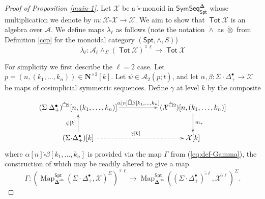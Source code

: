 \documentclass[11pt]{amsart}
\theoremstyle{definition}
\theoremstyle{remark}
\newcommand{\Spt}{\mathsf{Spt}}
\newcommand{\Tot}{\operatorname{\mathsf{Tot}}}
\newcommand{\SymSeq}{\mathsf{SymSeq}}
\newcommand{\Map}{\operatorname{Map}}
\newcommand{\homu}{\operatorname{\mathbf{hom}}}
\newcommand{\Cal}[1]{\mathcal{#1}}
\newcommand{\Ncirc}[1]{\mathbf{N}^{\hat{\circ}#1}}
\newcommand{\circhat}{\hat{\circ}}
\newcommand{\tensordot}{\dot{\otimes}}
\newcommand{\boxcirc}{\mathring{\square}}
\newcommand{\SD}{\Sigma{\cdot}\Delta^{\bullet}}
\newcommand{\bdel}{\mathbf{\Delta}}
\newcommand{\Dres}{\bdel^{\mathsf{res}}}
\begin{document}
\begin{proof}[Proof of Proposition \ref{main-1}]

Let $\Cal{X}$ be a $\boxcirc$-monoid in $\SymSeq^{\bdel}_{\Spt}$ whose multiplication we denote by $m\colon \Cal{X}\boxcirc \Cal{X}\to\Cal{X}$. We aim to show that $\Tot \Cal{X}$ is an algebra over $\Cal{A}$. We define maps $\lambda_{\ell}$ as follows (note the notation $\dot{\wedge}$ as $\tensordot$ from Definition \ref{ccp} for the monoidal category $(\Spt,\wedge,S)$)\[
    \lambda_{\ell}\colon \Cal{A}_{\ell}\dot{\wedge}_{\Sigma} (\Tot \Cal{X})^{\circhat \ell} \to \Tot \Cal{X}    %
\]

For simplicity we first describe the $\ell=2$ case. Let $\underline{p}=(n,(k_1,\dots,k_n))\in\Ncirc{2}[k]$. Let $\psi\in \mathcal{A}_2(\underline{p};t)$, and let $\alpha,\beta\colon \SD_+\to \Cal{X}$ be maps of cosimplicial symmetric sequences. Define $\gamma$ at level $k$ by the composite\begin{equation*} 
\xymatrix{
    (\SD_+)^{\boxcirc 2} [n, (k_1,\dots,k_n)] \ar[rr]^-{\alpha[n]\boxcirc \beta[k_1,\dots,k_n]} 
    && (\Cal{X}^{\boxcirc2})[n, (k_1,\dots,k_n)] \ar[d]^{m_*}\\
    (\SD_+)[k] \ar[u]^-{\psi[k]} \ar@{.>}[rr]^{\gamma[k]} && \Cal{X}[k] }
\end{equation*}
where $\alpha[n] \boxcirc \beta[k_1,\dots,k_n]$ is provided via the map $\Gamma$ from (\ref{eq:def-Gamma}), the construction of which may be readily altered to give a map  \[
        \Gamma \colon \left( \Map_{\Dres}^{\Spt} \left(\SD_+, \Cal{X}\right)^{\Sigma}\right)^{\circhat \ell} \to \Map_{\Dres}^{\Spt}\left((\SD_+)^{\boxcirc \ell}, \Cal{X}^{\boxcirc \ell}\right)^{\Sigma}.\] 


\end{proof}
\end{document}
